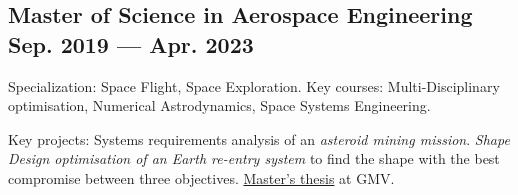 


\subsection{{Master of Science in Aerospace Engineering} \hfill Sep. 2019 --- Apr. 2023 }
\begin{zitemize}
\item Specialization: Space Flight, Space Exploration. Key courses:  Multi-Disciplinary optimisation, Numerical Astrodynamics, Space Systems Engineering. 
\item Key projects: 
     Systems requirements analysis of an \textit{asteroid mining mission}. 
     \textit{Shape Design optimisation of an Earth re-entry system} to find the shape with the best compromise between three objectives. 
     \href{https://repository.tudelft.nl/islandora/object/uuid:f472201e-0e32-4b9e-8aa3-04521908396a}{Master's thesis} at GMV.

\end{zitemize}

